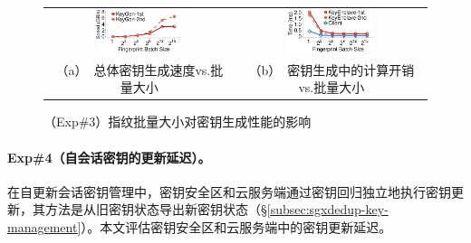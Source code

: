 \begin{figure}[!htb]
\centering
\begin{tabular}{@{\ }c@{\ }c}
\includegraphics[width=0.48\textwidth]{pic/sgxdedup/expa2_keyEnclaveBatchSize_Performance_overall.pdf}                                         &
\includegraphics[width=0.48\textwidth]{pic/sgxdedup/expa2_keyEnclaveBatchSize_Performance_1st.pdf}                                               \\
\mbox{\parbox{0.48\textwidth}{\small （a） 总体密钥生成速度vs.批量大小}} &
\mbox{\parbox{0.48\textwidth}{\small （b） 密钥生成中的计算开销vs.批量大小}}
\end{tabular}
\caption{（Exp\#3）指纹批量大小对密钥生成性能的影响}
\label{fig:sgxdedup-exp-keygen-breakdown}
\end{figure}


\paragraph*{Exp\#4（自会话密钥的更新延迟）。} 

在自更新会话密钥管理中，密钥安全区和云服务端通过密钥回归独立地执行密钥更新，其方法是从旧密钥状态导出新密钥状态（\S\ref{subsec:sgxdedup-key-management}）。本文评估密钥安全区和云服务端中的密钥更新延迟。

